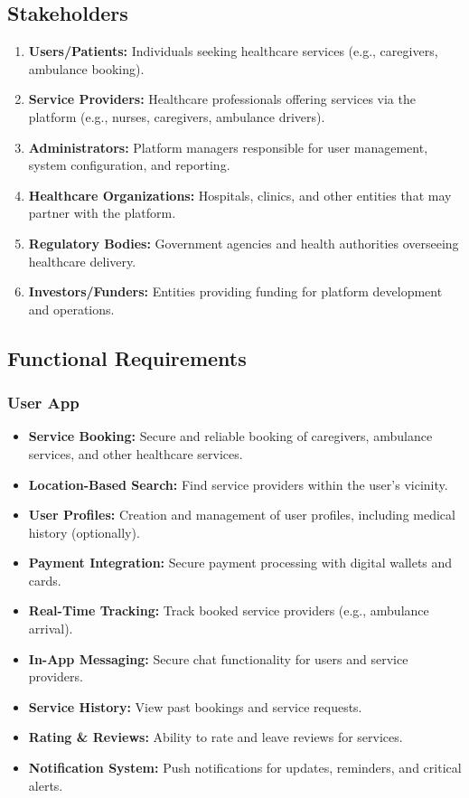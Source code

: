 \documentclass[12pt]{article}
\begin{document}
\subsection{Stakeholders}
\begin{enumerate}
    \item \textbf{Users/Patients:} Individuals seeking healthcare services (e.g., caregivers, ambulance booking).
    \item \textbf{Service Providers:} Healthcare professionals offering services via the platform (e.g., nurses, caregivers, ambulance drivers).
     \item \textbf{Administrators:} Platform managers responsible for user management, system configuration, and reporting.
     \item \textbf{Healthcare Organizations:} Hospitals, clinics, and other entities that may partner with the platform.
    \item \textbf{Regulatory Bodies:} Government agencies and health authorities overseeing healthcare delivery.
     \item \textbf{Investors/Funders:} Entities providing funding for platform development and operations.
\end{enumerate}

\subsection{Functional Requirements}

\subsubsection{User App}

\begin{itemize}
    \item \textbf{Service Booking:} Secure and reliable booking of caregivers, ambulance services, and other healthcare services.
    \item \textbf{Location-Based Search:} Find service providers within the user's vicinity.
    \item \textbf{User Profiles:} Creation and management of user profiles, including medical history (optionally).
    \item \textbf{Payment Integration:} Secure payment processing with digital wallets and cards.
     \item \textbf{Real-Time Tracking:} Track booked service providers (e.g., ambulance arrival).
    \item \textbf{In-App Messaging:} Secure chat functionality for users and service providers.
     \item \textbf{Service History:} View past bookings and service requests.
   \item \textbf{Rating \& Reviews:} Ability to rate and leave reviews for services.
    \item \textbf{Notification System:} Push notifications for updates, reminders, and critical alerts.
\end{itemize}
\end{document}

